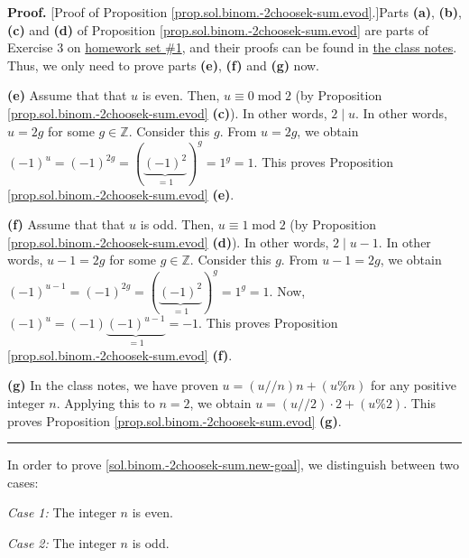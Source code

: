 \documentclass[paper=a4, fontsize=12pt]{scrartcl}%
\theoremstyle{plainsl}
\theoremstyle{definition}
\theoremstyle{remark}
\newenvironment{proof}[1][Proof]{\noindent\textbf{#1.} }{\ \rule{0.5em}{0.5em}}
\begin{document}
\begin{proof}
[Proof of Proposition \ref{prop.sol.binom.-2choosek-sum.evod}.]Parts
\textbf{(a)}, \textbf{(b)}, \textbf{(c)} and \textbf{(d)} of Proposition
\ref{prop.sol.binom.-2choosek-sum.evod} are parts of Exercise 3 on
\href{http://www-users.math.umn.edu/~dgrinber/19s/hw1s.pdf}{homework set \#1},
and their proofs can be found in
\href{http://www-users.math.umn.edu/~dgrinber/19s/notes.pdf}{the class notes}.
Thus, we only need to prove parts \textbf{(e)}, \textbf{(f)} and \textbf{(g)} now.

\textbf{(e)} Assume that that $u$ is even. Then, $u\equiv0\operatorname{mod}2$
(by Proposition \ref{prop.sol.binom.-2choosek-sum.evod} \textbf{(c)}). In
other words, $2\mid u$. In other words, $u=2g$ for some $g\in\mathbb{Z}$.
Consider this $g$. From $u=2g$, we obtain $\left(  -1\right)  ^{u}=\left(
-1\right)  ^{2g}=\left(  \underbrace{\left(  -1\right)  ^{2}}_{=1}\right)
^{g}=1^{g}=1$. This proves Proposition \ref{prop.sol.binom.-2choosek-sum.evod}
\textbf{(e)}.

\textbf{(f)} Assume that that $u$ is odd. Then, $u\equiv1\operatorname{mod}2$
(by Proposition \ref{prop.sol.binom.-2choosek-sum.evod} \textbf{(d)}). In
other words, $2\mid u-1$. In other words, $u-1=2g$ for some $g\in\mathbb{Z}$.
Consider this $g$. From $u-1=2g$, we obtain $\left(  -1\right)  ^{u-1}=\left(
-1\right)  ^{2g}=\left(  \underbrace{\left(  -1\right)  ^{2}}_{=1}\right)
^{g}=1^{g}=1$. Now, $\left(  -1\right)  ^{u}=\left(  -1\right)
\underbrace{\left(  -1\right)  ^{u-1}}_{=1}=-1$. This proves Proposition
\ref{prop.sol.binom.-2choosek-sum.evod} \textbf{(f)}.

\textbf{(g)} In the class notes, we have proven $u=\left(  u//n\right)
n+\left(  u\%n\right)  $ for any positive integer $n$. Applying this to $n=2$,
we obtain $u=\left(  u//2\right)  \cdot2+\left(  u\%2\right)  $. This proves
Proposition \ref{prop.sol.binom.-2choosek-sum.evod} \textbf{(g)}.
\end{proof}

In order to prove \eqref{sol.binom.-2choosek-sum.new-goal}, we distinguish
between two cases:

\textit{Case 1:} The integer $n$ is even.

\textit{Case 2:} The integer $n$ is odd.
\end{document}
